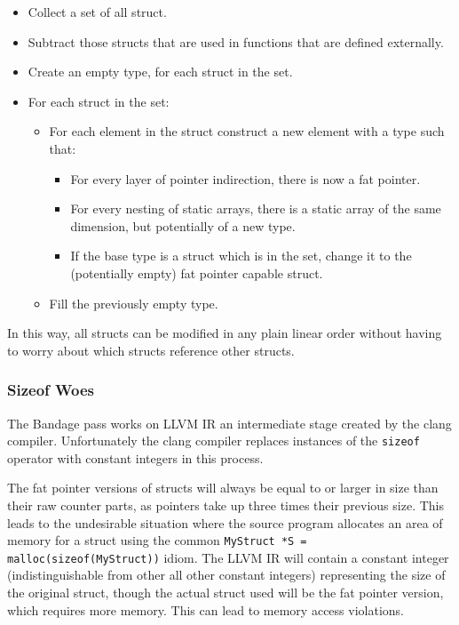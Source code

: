 \begin{itemize}
\item Collect a set of all struct.
\item Subtract those structs that are used in functions that are defined externally.
\item Create an empty type, for each struct in the set.
\item For each struct in the set:
\begin{itemize}
\item For each element in the struct construct a new element with a type such that:
\begin{itemize}
\item For every layer of pointer indirection, there is now a fat pointer.
\item For every nesting of static arrays, there is a static array of the same dimension, but potentially of a new type.
\item If the base type is a struct which is in the set, change it to the (potentially empty) fat pointer capable struct.
\end{itemize}
\item Fill the previously empty type.
\end{itemize}
\end{itemize}

In this way, all structs can be modified in any plain linear order without having to worry about which structs reference other structs.
	
\subsubsection{Sizeof Woes}

The Bandage pass works on LLVM IR an intermediate stage created by the clang compiler.
Unfortunately the clang compiler replaces instances of the \verb!sizeof! operator with constant integers in this process.

The fat pointer versions of structs will always be equal to or larger in size than their raw counter parts, as pointers take up three times their previous size.
This leads to the undesirable situation where the source program allocates an area of memory for a struct using the common \verb!MyStruct *S = malloc(sizeof(MyStruct))! idiom.
The LLVM IR will contain a constant integer (indistinguishable from other all other constant integers) representing the size of the original struct, though the actual struct used will be the fat pointer version, which requires more memory.
This can lead to memory access violations.

